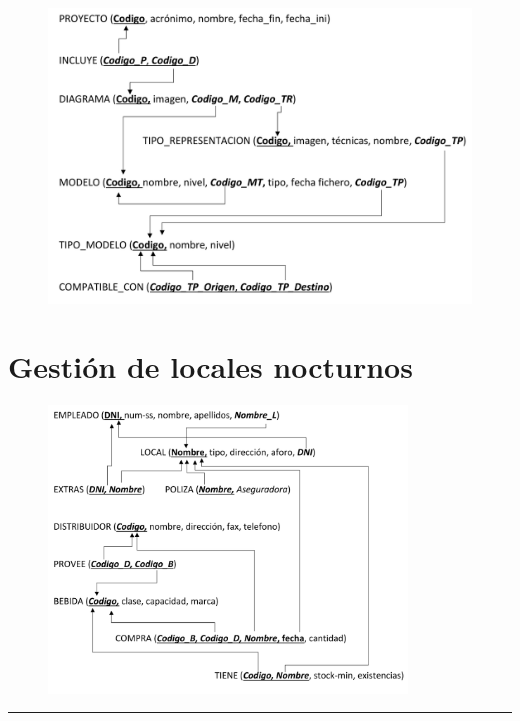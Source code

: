\documentclass[a4paper]{article}
\begin{document}
\begin{figure}[H]
    \includegraphics[width=\textwidth]{figs/desarrollo-dirigido-por-modelos-sol}
\end{figure}

\section{Gestión de locales nocturnos}


\begin{figure}[H]
    \includegraphics[width=0.85\textwidth]{figs/gestion-locales-nocturnos-sol.pdf}
\end{figure}

\vspace{2em}
\hrule
\doclicenseThis
\end{document}
